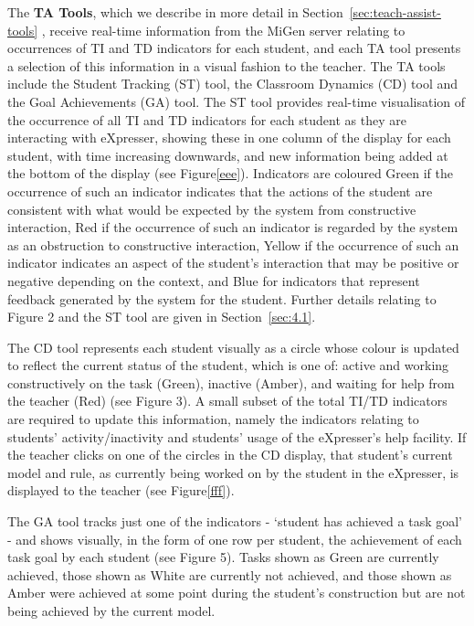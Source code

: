 The {\bf TA Tools}, which we describe in more detail in
Section~\ref{sec:teach-assist-tools} ,
receive real-time information from the MiGen server relating to
occurrences of TI and TD indicators for each student, and each TA tool
presents a selection of this information in a visual fashion to the
teacher.  The TA tools include the Student Tracking (ST) tool, the
Classroom Dynamics (CD) tool and the Goal Achievements (GA) tool. The
ST tool provides real-time visualisation of the occurrence of all TI
and TD indicators for each student as they are interacting with
eXpresser, showing these in one column of the display for each
student, with time increasing downwards, and new information being
added at the bottom of the display (see Figure\ref{eee}). Indicators
are coloured Green if the occurrence of such an indicator indicates
that the actions of the student are consistent with what would be
expected by the system from constructive interaction, Red if the
occurrence of such an indicator is regarded by the system as an
obstruction to constructive interaction, Yellow if the occurrence of
such an indicator indicates an aspect of the student’s interaction
that may be positive or negative depending on the context, and Blue
for indicators that represent feedback generated by the system for the
student. Further details relating to Figure 2 and the ST tool are
given in Section~\ref{sec:4.1}.

The CD tool represents each student visually as a circle whose colour
is updated to reflect the current status of the student, which is one
of: active and working constructively on the task (Green), inactive
(Amber), and waiting for help from the teacher (Red) (see Figure 3). A
small subset of the total TI/TD indicators are required to update this
information, namely the indicators relating to students’
activity/inactivity and students’ usage of the eXpresser’s help
facility. If the teacher clicks on one of the circles in the CD
display, that student’s current model and rule, as currently being
worked on by the student in the eXpresser, is displayed to the teacher
(see Figure\ref{fff}).

The GA tool tracks just one of the indicators - `student has achieved
a task goal' - and shows visually, in the form of one row per student,
the achievement of each task goal by each student (see Figure
5). Tasks shown as Green are currently achieved, those shown as White
are currently not achieved, and those shown as Amber were achieved at
some point during the student’s construction but are not being
achieved by the current model.

